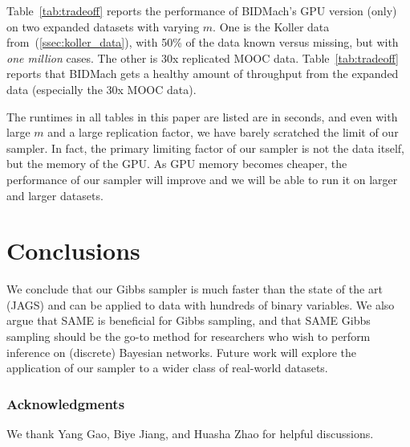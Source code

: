 \documentclass{article} %
\begin{document}
Table~\ref{tab:tradeoff} reports the performance of BIDMach's GPU version (only) on two expanded
datasets with varying $m$. One is the Koller data from~(\ref{ssec:koller_data}), with 50\% of the
data known versus missing, but with \emph{one million} cases. The other is 30x replicated MOOC data.
Table~\ref{tab:tradeoff} reports that BIDMach gets a healthy amount of throughput from the expanded
data (especially the 30x MOOC data).

The runtimes in all tables in this paper are listed are in seconds, and even with large $m$ and a
large replication factor, we have barely scratched the limit of our sampler. In fact, the primary
limiting factor of our sampler is not the data itself, but the memory of the GPU. As GPU memory
becomes cheaper, the performance of our sampler will improve and we will be able to run it on larger
and larger datasets.



\section{Conclusions}\label{sec:conclusions}

We conclude that our Gibbs sampler is much faster than the state of the art (JAGS) and can be
applied to data with hundreds of binary variables. We also argue that SAME is beneficial for Gibbs
sampling, and that SAME Gibbs sampling should be the go-to method for researchers who wish to
perform inference on (discrete) Bayesian networks. Future work will explore the application of our
sampler to a wider class of real-world datasets.


\subsubsection*{Acknowledgments}

We thank Yang Gao, Biye Jiang, and Huasha Zhao for helpful discussions.












%
\end{document}
